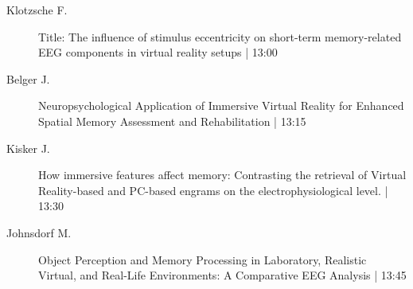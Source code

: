 \begin{symposium}
\begin{description}
                \item [ Klotzsche F.] Title: The influence of stimulus eccentricity on short-term memory-related EEG components in virtual reality setups \textcolor{mygray}{ | 13:00}    
                
                \item [ Belger J.] Neuropsychological Application of Immersive Virtual Reality for Enhanced Spatial Memory Assessment and Rehabilitation \textcolor{mygray}{ | 13:15}    
                
                \item [ Kisker J.] How immersive features affect memory: Contrasting the retrieval of Virtual Reality-based and PC-based engrams on the electrophysiological level. \textcolor{mygray}{ | 13:30}    
                
                \item [ Johnsdorf M.] Object Perception and Memory Processing in Laboratory, Realistic Virtual, and Real-Life Environments: A Comparative EEG Analysis \textcolor{mygray}{ | 13:45}    
                
            \end{description} 
            \end{symposium}
            